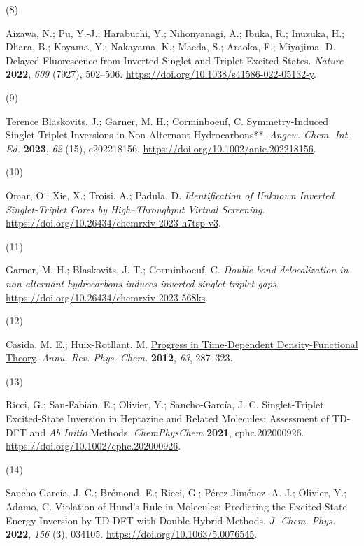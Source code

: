 \documentclass[
  number,
  3p]{elsarticle}
\newlength{\cslhangindent}
\newlength{\csllabelwidth}
\newlength{\cslentryspacingunit} %
\newenvironment{CSLReferences}[2] %
 {%
  \setlength{\parindent}{0pt}
  \ifodd #1
  \let\oldpar\par
  \def\par{\hangindent=\cslhangindent\oldpar}
  \fi
  \setlength{\parskip}{#2\cslentryspacingunit}
 }%
 {}
\newcommand{\CSLLeftMargin}[1]{\parbox[t]{\csllabelwidth}{#1}}
\newcommand{\CSLRightInline}[1]{\parbox[t]{\linewidth - \csllabelwidth}{#1}\break}
\begin{document}
\begin{CSLReferences}{0}{0}
\leavevmode{}%
\CSLLeftMargin{(8) }%
\CSLRightInline{Aizawa, N.; Pu, Y.-J.; Harabuchi, Y.; Nihonyanagi, A.;
Ibuka, R.; Inuzuka, H.; Dhara, B.; Koyama, Y.; Nakayama, K.; Maeda, S.;
Araoka, F.; Miyajima, D. Delayed Fluorescence from Inverted Singlet and
Triplet Excited States. \emph{Nature} \textbf{2022}, \emph{609} (7927),
502--506. \url{https://doi.org/10.1038/s41586-022-05132-y}.}

\leavevmode{}%
\CSLLeftMargin{(9) }%
\CSLRightInline{Terence Blaskovits, J.; Garner, M. H.; Corminboeuf, C.
Symmetry‐{Induced Singlet}‐{Triplet Inversions} in {Non}‐{Alternant
Hydrocarbons}**. \emph{Angew. Chem. Int. Ed.} \textbf{2023}, \emph{62}
(15), e202218156. \url{https://doi.org/10.1002/anie.202218156}.}

\leavevmode{}%
\CSLLeftMargin{(10) }%
\CSLRightInline{Omar, O.; Xie, X.; Troisi, A.; Padula, D.
\emph{Identification of {Unknown Inverted Singlet-Triplet Cores} by
{High--Throughput Virtual Screening}}.
\url{https://doi.org/10.26434/chemrxiv-2023-h7tsp-v3}.}

\leavevmode{}%
\CSLLeftMargin{(11) }%
\CSLRightInline{Garner, M. H.; Blaskovits, J. T.; Corminboeuf, C.
\emph{Double-bond delocalization in non-alternant hydrocarbons induces
inverted singlet-triplet gaps}.
\url{https://doi.org/10.26434/chemrxiv-2023-568ks}.}

\leavevmode{}%
\CSLLeftMargin{(12) }%
\CSLRightInline{Casida, M. E.; Huix-Rotllant, M.
\href{http://www.annualreviews.org/doi/full/10.1146/annurev-physchem-032511-143803}{Progress
in {Time-Dependent Density-Functional Theory}}. \emph{Annu. Rev. Phys.
Chem.} \textbf{2012}, \emph{63}, 287--323.}

\leavevmode{}%
\CSLLeftMargin{(13) }%
\CSLRightInline{Ricci, G.; San‐Fabián, E.; Olivier, Y.; Sancho‐García,
J. C. Singlet‐{Triplet Excited}‐{State Inversion} in {Heptazine} and
{Related Molecules}: {Assessment} of {TD}‐{DFT} and {\emph{Ab Initio}}
{Methods}. \emph{ChemPhysChem} \textbf{2021}, cphc.202000926.
\url{https://doi.org/10.1002/cphc.202000926}.}

\leavevmode{}%
\CSLLeftMargin{(14) }%
\CSLRightInline{Sancho-García, J. C.; Brémond, E.; Ricci, G.;
Pérez-Jiménez, A. J.; Olivier, Y.; Adamo, C. Violation of {Hund}'s Rule
in Molecules: {Predicting} the Excited-State Energy Inversion by
{TD-DFT} with Double-Hybrid Methods. \emph{J. Chem. Phys.}
\textbf{2022}, \emph{156} (3), 034105.
\url{https://doi.org/10.1063/5.0076545}.}


\end{CSLReferences}
\end{document}
